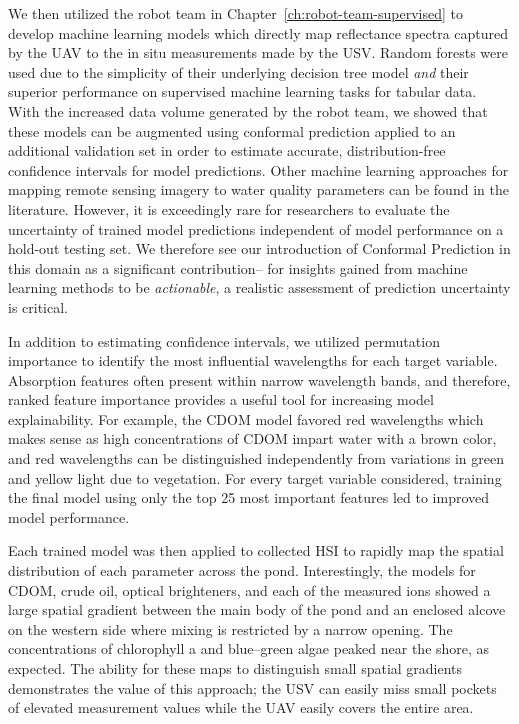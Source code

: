 We then utilized the robot team in Chapter~\ref{ch:robot-team-supervised} to
develop machine learning models which directly map reflectance spectra captured
by the UAV to the in situ measurements made by the USV. Random forests were used
due to the simplicity of their underlying decision tree model \textit{and}
their superior performance on supervised machine learning tasks for tabular
data. With the increased data volume generated by the robot team, we showed
that these models can be augmented using conformal prediction applied to an
additional validation set in order to estimate accurate, distribution-free
confidence intervals for model predictions. Other machine learning approaches
for mapping remote sensing imagery to water quality parameters can be found in
the literature. However, it is exceedingly rare for researchers to evaluate the
uncertainty of trained model predictions independent of model performance on a
hold-out testing set. We therefore see our introduction of Conformal
Prediction in this domain as a significant contribution-- for insights gained
from machine learning methods to be \textit{actionable}, a realistic assessment
of prediction uncertainty is critical.

In addition to estimating confidence intervals, we utilized permutation
importance to identify the most influential wavelengths for each target
variable. Absorption features often present within narrow wavelength
bands, and therefore, ranked feature importance provides a useful tool for
increasing model explainability. For example, the CDOM model favored red
wavelengths which makes sense as high concentrations of CDOM impart water with a
brown color, and red wavelengths can be distinguished independently from
variations in green and yellow light due to vegetation. For every target
variable considered, training the final model using only the top 25 most
important features led to improved model performance.

Each trained model was then applied to collected HSI to rapidly map the spatial
distribution of each parameter across the pond. Interestingly, the models for
CDOM, crude oil, optical brighteners, and each of the measured ions showed a
large spatial gradient between the main body of the pond and an enclosed alcove
on the western side where mixing is restricted by a narrow opening.
The concentrations of chlorophyll a and blue--green algae
peaked near the shore, as expected. The ability for these maps to
distinguish small spatial gradients demonstrates the value of this approach; the
USV can easily miss small pockets of elevated measurement values while the UAV
easily covers the entire area.

